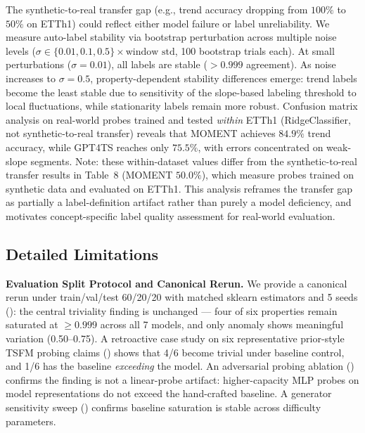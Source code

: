 \documentclass{article}
\begin{document}
The synthetic-to-real transfer gap (e.g., trend accuracy dropping from $100\%$ to $50\%$ on ETTh1) could reflect either model failure or label unreliability. We measure auto-label stability via bootstrap perturbation across multiple noise levels ($\sigma \in \{0.01, 0.1, 0.5\} \times \text{window std}$, 100 bootstrap trials each). At small perturbations ($\sigma = 0.01$), all labels are stable ($>0.999$ agreement). As noise increases to $\sigma = 0.5$, property-dependent stability differences emerge: trend labels become the least stable due to sensitivity of the slope-based labeling threshold to local fluctuations, while stationarity labels remain more robust. Confusion matrix analysis on real-world probes trained and tested \emph{within} ETTh1 (RidgeClassifier, not synthetic-to-real transfer) reveals that MOMENT achieves $84.9\%$ trend accuracy, while GPT4TS reaches only $75.5\%$, with errors concentrated on weak-slope segments. Note: these within-dataset values differ from the synthetic-to-real transfer results in Table~8 (MOMENT $50.0\%$), which measure probes trained on synthetic data and evaluated on ETTh1. This analysis reframes the transfer gap as partially a label-definition artifact rather than purely a model deficiency, and motivates concept-specific label quality assessment for real-world evaluation.

\subsection{Detailed Limitations}

\textbf{Evaluation Split Protocol and Canonical Rerun.} We provide a canonical rerun under train/val/test 60/20/20 with matched sklearn estimators and 5 seeds (): the central triviality finding is unchanged --- four of six properties remain saturated at $\geq 0.999$ across all 7 models, and only anomaly shows meaningful variation (0.50--0.75). A retroactive case study on six representative prior-style TSFM probing claims () shows that 4/6 become trivial under baseline control, and 1/6 has the baseline \emph{exceeding} the model. An adversarial probing ablation () confirms the finding is not a linear-probe artifact: higher-capacity MLP probes on model representations do not exceed the hand-crafted baseline. A generator sensitivity sweep () confirms baseline saturation is stable across difficulty parameters.
\end{document}
